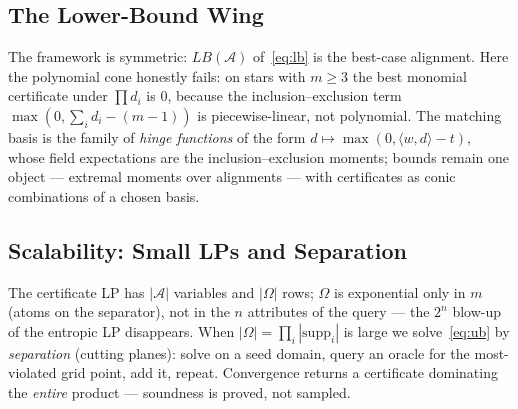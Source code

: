\subsection{The Lower-Bound Wing}
\label{sec:lbwing}

The framework is symmetric: $LB(\mathcal{A})$ of~\eqref{eq:lb} is the
best-case alignment.  Here the polynomial cone honestly fails: on
stars with $m\ge 3$ the best monomial certificate under $\prod d_i$ is
$0$, because the inclusion--exclusion term
$\max(0,\sum_i d_i - (m{-}1))$ is piecewise-linear, not polynomial.
The matching basis is the family of \emph{hinge functions} of the
form $d \mapsto \max(0,\langle w,d\rangle - t)$, whose field
expectations are the
inclusion--exclusion moments; bounds remain one object --- extremal
moments over alignments --- with certificates as conic combinations
of a chosen basis.

\subsection{Scalability: Small LPs and Separation}
\label{sec:sep}

The certificate LP has $|\mathcal{A}|$ variables and $|\Omega|$ rows;
$\Omega$ is exponential only in $m$ (atoms on the separator), not in
the $n$ attributes of the query --- the $2^n$ blow-up of the entropic
LP disappears.  When $|\Omega| = \prod_i |\mathrm{supp}_i|$ is large
we solve~\eqref{eq:ub} by \emph{separation} (cutting planes): solve on
a seed domain, query an oracle for the most-violated grid point, add
it, repeat.  Convergence returns a certificate dominating the
\emph{entire} product --- soundness is proved, not sampled.
